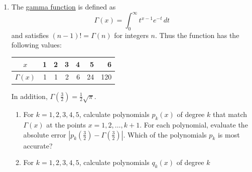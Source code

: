 \documentclass[12pt]{article}
\begin{document}
\begin{enumerate}
    $\kappa(A) = \|A\|\,\|A^{-1}\|$ as discussed in the lectures. Assume that
    the matrix norm is defined using the Euclidean vector norm.
    \begin{enumerate}
      \item Find two $2\times 2$ invertible matrices $B$ and $C$ such that
        $\kappa(B+C) < \kappa(B) + \kappa(C)$.
      \item Find two $2\times 2$ invertible matrices $B$ and $C$ such that
        $\kappa(B+C) > \kappa(B) + \kappa(C)$.
      \item Suppose that $A$ is a symmetric invertible matrix. Find
        $\kappa(A^2)$ in terms of $\kappa(A)$.\footnote{You may find it useful
        to recall that a symmetric matrix $A$ can be
        written as $A = Q D Q^\mathsf{T}$ where $D$ is diagonal and $Q$ is
        orthogonal.}
      \item Does the result from part (c) hold if $A$ is not symmetric? Either
        prove the result, or find a counterexample.
      \item For invertible matrices $B$ and $C$, prove that $\kappa(BC) \le
        \kappa(B) \kappa(C)$. Find examples where
        $\kappa(BC)=\kappa(B)\kappa(C)$ and $\kappa(BC) <\kappa(B)\kappa(C)$.
    \end{enumerate}
  \item The \href{https://en.wikipedia.org/wiki/Gamma_function}{gamma
    function} is defined as
    \begin{equation}
      \Gamma(x) = \int_0^\infty t^{x-1} e^{-t}\,dt
    \end{equation}
    and satisfies $(n-1)! = \Gamma(n)$ for integers $n$. Thus the
    function has the following values:
    \begin{center}
      \begin{tabular}{c|r|r|r|r|r|r}
        $x$ & 1 & 2 & 3 & 4 & 5 & 6 \\
        \hline
        $\Gamma(x)$ & 1 & 1 & 2 & 6 & 24 & 120
      \end{tabular}
    \end{center}
    In addition, $\Gamma(\tfrac32)= \tfrac12 \sqrt\pi$.
    \begin{enumerate}
      \item For $k=1,2,3,4,5$, calculate polynomials $p_k(x)$ of degree $k$
        that match $\Gamma(x)$ at the points $x=1,2,\ldots,k+1$. For each
        polynomial, evaluate the absolute error $|p_k(\tfrac32) -
        \Gamma(\tfrac32)|$. Which of the polynomials $p_k$ is most accurate?
      \item For $k=1,2,3,4,5$, calculate polynomials $q_k(x)$ of degree $k$

\end{enumerate}
\end{enumerate}
\end{document}
